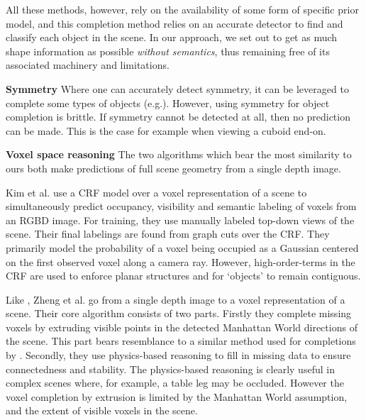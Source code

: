 \documentclass[10pt,twocolumn,letterpaper]{article}
\makeatletter
\renewcommand*{\eg}{e.g.\@\xspace}
\newcommand*{\ea}{et al.\@\xspace}
\renewcommand{\paragraph}{\vspace{2pt}\noindent\textbf}
\makeatother
\begin{document}
All these methods, however, rely on the availability of some form of specific prior model, and this completion method relies on an accurate detector to find and classify each object in the scene.
In our approach, we set out to get as much shape information as possible \emph{without semantics}, thus remaining free of its associated machinery and limitations.



\paragraph{Symmetry}
Where one can accurately detect symmetry, it can be leveraged to complete some types of objects (\eg \cite{law-cviu-2010, thrun-iccv-2005, kroemer-humanoids-2012}).
However, using symmetry for object completion is brittle.
If symmetry cannot be detected at all, then no prediction can be made.
This is the case for example when viewing a cuboid end-on.


\paragraph{Voxel space reasoning}
The two algorithms which bear the most similarity to ours both make predictions of full scene geometry from a single depth image.

Kim \ea \cite{kim-iccv-2013} use a CRF model over a voxel representation of a scene to simultaneously predict occupancy, visibility and semantic labeling of voxels from an RGBD image.
For training, they use manually labeled top-down views of the scene.
Their final labelings are found from graph cuts over the CRF.
They primarily model the probability of a voxel being occupied as a Gaussian centered on the first observed voxel along a camera ray.
However, high-order-terms in the CRF are used to enforce planar structures and for `objects' to remain contiguous.

Like \cite{kim-iccv-2013},  Zheng \ea \cite{zheng-cvpr-2013} go from a single depth image to a voxel representation of a scene.
Their core algorithm consists of two parts.
Firstly they complete missing voxels by extruding visible points in the detected Manhattan World directions of the scene.
This part bears resemblance to a similar method used for completions by \cite{kroemer-humanoids-2012}.
Secondly, they use physics-based reasoning to fill in missing data to ensure connectedness and stability.
The physics-based reasoning is clearly useful in complex scenes where, for example, a table leg may be occluded.
However the voxel completion by extrusion is limited by the Manhattan World assumption, and the extent of visible voxels in the scene.
\end{document}
